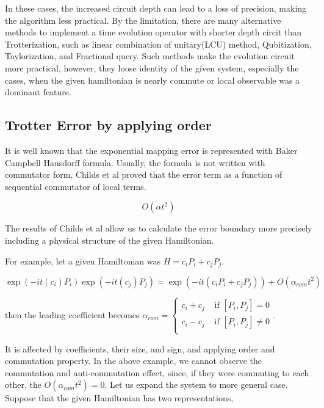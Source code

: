 \documentclass[a4paper,12pt]{article}
\begin{document}
In these cases, the increased circuit depth can lead to a loss of precision, making the algorithm less practical.
By the limitation, there are many alternative methods to implement a time evolution operator 
with shorter depth circit than Trotterization, such as 
linear combination of unitary(LCU) method\cite{dewolf2023quantumcomputinglecturenotes}, Qubitization\cite{Low_2019}, 
Taylorization\cite{PhysRevLett.114.090502}, and Fractional query\cite{Berry_2014}.
Such methods make the evolution circuit more practical, however, they loose 
identity of the given system, especially the cases, when the given hamiltonian is nearly commute
or local observable was a dominant feature\cite{childs_theory_2021}. 

\subsection{Trotter Error by applying order}

It is well known that the exponential mapping error is represented with Baker Campbell Hausdorff formula.
Usually, the formula is not written with commutator form, Childs et al proved that the error term 
as a function of sequential commutator of local terms.%

\begin{equation}
    O(\alpha t^2)
\end{equation}

The results of Childs et al allow us to calculate 
the error boundary more precisely including a physical structure 
of the given Hamiltonian.

For example, let a given Hamiltonian was $H = c_i P_i + c_j P_j$.

\begin{equation}
    \exp(-it (c_i) P_i) \exp(-it (c_j) P_j) = \exp(- it (c_i P_i + c_j P_j)) + O (\alpha_{com}t^2)
\end{equation}

then the leading coefficient becomes $\alpha_{com} = \begin{cases}
    c_i + c_j & \mbox{ if } [P_i, P_j] = 0 \\
    c_i - c_j & \mbox{ if } [P_i, P_j] \neq 0 \\
\end{cases}$.

It is affected by coefficients, their size, and sign, and 
applying order and commutation property.
In the above example, we cannot observe the commutation and anti-commutation
effect, since, if they were commuting to each other, the $O(\alpha_{com} t^2) = 0$.
Let us expand the system to more general case.
Suppose that the given Hamiltonian has two representations,
\end{document}
